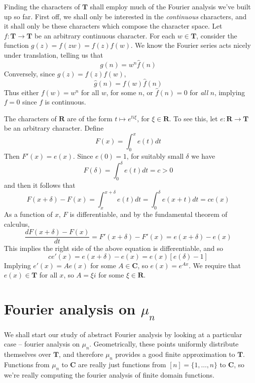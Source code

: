 \begin{example}
    Finding the characters of $\mathbf{T}$ shall employ much of the Fourier analysis we've built up so far. First off, we shall only be interested in the {\it continuous} characters, and it shall only be these characters which compose the character space. Let $f: \mathbf{T} \to \mathbf{T}$ be an arbitrary continuous character. For each $w \in \mathbf{T}$, consider the function $g(z) = f(zw) = f(z)f(w)$. We know the Fourier series acts nicely under translation, telling us that
    \[ \hat{g}(n) = w^n \hat{f}(n) \]
    Conversely, since $g(z) = f(z)f(w)$,
    \[ \hat{g}(n) = f(w) \hat{f}(n) \]
    Thus either $f(w) = w^n$ for all $w$, for some $n$, or $\hat{f}(n) = 0$ for {\it all} $n$, implying $f = 0$ since $f$ is continuous.
\end{example}

\begin{example}
    The characters of $\mathbf{R}$ are of the form $t \mapsto e^{ti\xi}$, for $\xi \in \mathbf{R}$. To see this, let $e: \mathbf{R} \to \mathbf{T}$ be an arbitrary character. Define
    \[ F(x) = \int_0^x e(t) dt \]
    Then $F'(x) = e(x)$. Since $e(0) = 1$, for suitably small $\delta$ we have
    \[ F(\delta) = \int_0^\delta e(t) dt = c > 0 \]
    and then it follows that
    \[ F(x + \delta) - F(x) = \int_x^{x + \delta} e(t) dt = \int_0^\delta e(x + t) dt = c e(x) \]
    As a function of $x$, $F$ is differentiable, and by the fundamental theorem of calculus,
    \[ \frac{dF(x + \delta) - F(x)}{dt} = F'(x + \delta) - F'(x) = e(x + \delta) - e(x) \]
    This implies the right side of the above equation is differentiable, and so
    \[ ce'(x) = e(x + \delta) - e(x) = e(x) [e(\delta) - 1] \]
    Implying $e'(x) = A e(x)$ for some $A \in \mathbf{C}$, so $e(x) = e^{Ax}$. We require that $e(x) \in \mathbf{T}$ for all $x$, so $A = \xi i$ for some $\xi \in \mathbf{R}$.
\end{example}

\section{Fourier analysis on $\mu_n$}

We shall start our study of abstract Fourier analysis by looking at a particular case -- fourier analysis on $\mu_n$. Geometrically, these points uniformly distribute themselves over $\mathbf{T}$, and therefore $\mu_n$ provides a good finite approximation to $\mathbf{T}$. Functions from $\mu_n$ to $\mathbf{C}$ are really just functions from $[n] = \{ 1, \dots, n \}$ to $\mathbf{C}$, so we're really computing the fourier analysis of finite domain functions.


